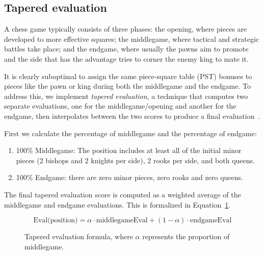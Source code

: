 \subsection{Tapered evaluation}

A chess game typically consists of three phases: the opening, where pieces are developed to more effective squares; the middlegame, where tactical and strategic battles take place; and the endgame, where usually the pawns aim to promote and the side that has the advantage tries to corner the enemy king to mate it.

\vspace{1em}

\noindent It is clearly suboptimal to assign the same piece-square table (PST) bonuses to pieces like the pawn or king during both the middlegame and the endgame. To address this, we implement \textit{tapered evaluation}, a technique that computes two separate evaluations, one for the middlegame/opening and another for the endgame, then interpolates between the two scores to produce a final evaluation~\cite{TaperedEvaluation}.

\vspace{1em}

\noindent First we calculate the percentage of middlegame and the percentage of endgame:

\begin{enumerate}
    \item 100\% Middlegame: The position includes at least all of the initial minor pieces (2 bishops and 2 knights per side), 2 rooks per side, and both queens.
    \item 100\% Endgame: there are zero minor pieces, zero rooks and zero queens.
\end{enumerate}

\noindent The final tapered evaluation score is computed as a weighted average of the middlegame and endgame evaluations. This is formalized in Equation~\ref{fig:taperedEvalEquation}.

\begin{figure}[H]
    \centering
    \begin{minipage}{0.8\linewidth}
        \centering
        \begin{equation*}
            \text{Eval(position)} = \alpha \cdot \text{middlegameEval} + (1 - \alpha) \cdot \text{endgameEval}
        \end{equation*}
        \vspace{-1em}
    \end{minipage}
    \caption{Tapered evaluation formula, where $\alpha$ represents the proportion of middlegame.}
    \label{fig:taperedEvalEquation}
\end{figure}


